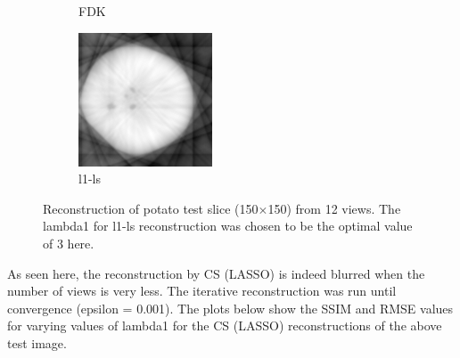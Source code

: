 \documentclass{article}
\begin{document}
\begin{figure}[!h]
\begin{subfigure}[b]{0.3\linewidth}
        \caption{FDK}
    \end{subfigure}
    \begin{subfigure}[b]{0.3\linewidth}
        \includegraphics[width=\textwidth]{../images/potato/2D/cs_blurred_results/12_views/result_CS_lambda0_3.00.png}
        \caption{l1-ls}
    \end{subfigure}
     \caption{Reconstruction of potato test slice (150$\times$150) from 12 views. The lambda1 for l1-ls reconstruction was chosen to be the optimal value of 3 here.} 
\label{fig:cs_blurred_12_views}
\end{figure}
As seen here, the reconstruction by CS (LASSO) is indeed blurred when the number of views is very less. The iterative reconstruction was run until convergence (epsilon = 0.001).
The plots below show the SSIM and RMSE values for varying values of lambda1 for the CS (LASSO) reconstructions of the above test image.
\end{document}
